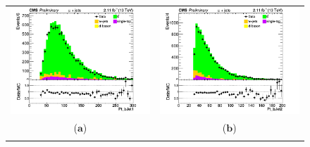 \documentclass{cmspaper}
\begin{document}
\begin{figure}[htp]
\centering
\begin{tabular}{cc}
\hspace{-0.5cm}
\includegraphics[scale=0.40]{results/Pt_bJet1.png}
& \hspace{-0.5cm} \includegraphics[scale=0.40]{results/Pt_bJet2.png}\\
   ($\mathbf{a}$)\qquad\qquad&($\mathbf{b}$)\qquad\qquad\qquad\\
\hspace{-0.5cm}

\end{tabular}
\end{figure}
\end{document}
